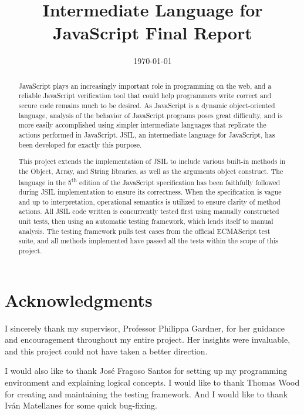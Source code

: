 \documentclass[a4paper,11pt,twoside]{report}
\title{Intermediate Language for JavaScript Final Report}
\date{\today}
\begin{document}


\clearpage{\pagestyle{empty}\cleardoublepage}
\setcounter{page}{1}
\pagestyle{fancy}

\begin{abstract}
JavaScript plays an increasingly important role in programming on the web, and a reliable JavaScript verification tool that could help programmers write correct and secure code remains much to be desired. As JavaScript is a dynamic object-oriented language, analysis of the behavior of JavaScript programs poses great difficulty, and is more easily accomplished using simpler intermediate languages that replicate the actions performed in JavaScript. JSIL, an intermediate language for JavaScript, has been developed for exactly this purpose.

This project extends the implementation of JSIL to include various built-in methods in the Object, Array, and String libraries, as well as the arguments object construct. The language in the 5\textsuperscript{th} edition of the JavaScript specification has been faithfully followed during JSIL implementation to ensure its correctness. When the specification is vague and up to interpretation, operational semantics is utilized to ensure clarity of method actions. All JSIL code written is concurrently tested first using manually constructed unit tests, then using an automatic testing framework, which lends itself to manual analysis. The testing framework pulls test cases from the official ECMAScript test suite, and all methods implemented have passed all the tests within the scope of this project.
\end{abstract}

\cleardoublepage
\section*{Acknowledgments}
I sincerely thank my supervisor, Professor Philippa Gardner, for her guidance and encouragement throughout my entire project. Her insights were invaluable, and this project could not have taken a better direction.

I would also like to thank Jos\'e Fragoso Santos for setting up my programming environment and explaining logical concepts. I would like to thank Thomas Wood for creating and maintaining the testing framework. And I would like to thank Iv\'an Matellanes for some quick bug-fixing.
\end{document}
